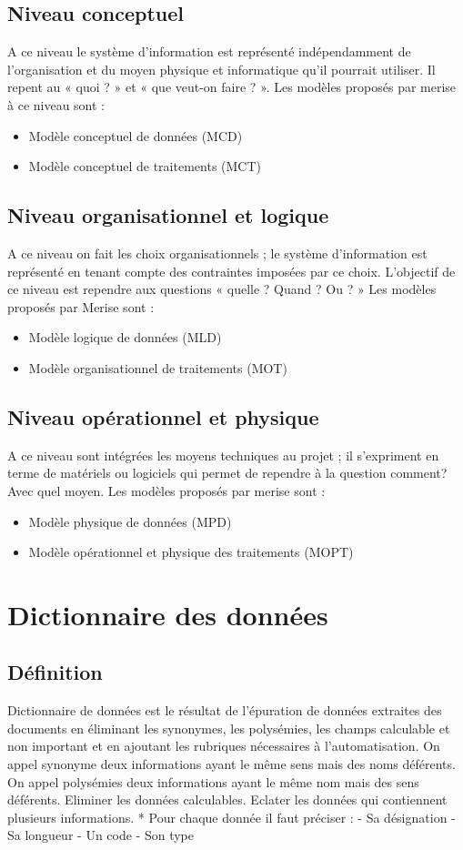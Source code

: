 \subsection{Niveau conceptuel}
A ce niveau le système d'information est représenté indépendamment de
l'organisation et du moyen physique et informatique qu'il pourrait utiliser. Il
repent au « quoi ? » et « que veut-on faire ? ».
Les modèles proposés par merise à ce niveau sont :
\begin{itemize}
    \item Modèle conceptuel de données (MCD)
    \item Modèle conceptuel de traitements (MCT)
\end{itemize}

\subsection{Niveau organisationnel et logique}
A ce niveau  on fait les choix organisationnels ; le système d'information est
représenté en tenant compte des contraintes imposées par ce choix. L'objectif
de ce niveau est rependre aux questions « quelle ? Quand ? Ou ? »
Les modèles proposés par Merise sont :
\begin{itemize}
    \item Modèle logique de données (MLD)
    \item Modèle organisationnel de traitements (MOT)
\end{itemize}

\subsection{Niveau opérationnel et physique}
A ce niveau sont intégrées les moyens techniques au projet ; il s’expriment en
terme de matériels ou logiciels  qui permet de rependre à la question
comment? Avec quel moyen.
Les modèles proposés par merise sont :
\begin{itemize}
    \item Modèle physique de données (MPD)
    \item Modèle opérationnel et physique des traitements (MOPT)
\end{itemize}

\section{Dictionnaire des données}
\subsection{Définition}
Dictionnaire de données est le résultat de l'épuration de données extraites
des documents en éliminant les synonymes, les polysémies, les champs
calculable et non important et en ajoutant les rubriques nécessaires à
l'automatisation.
 On appel synonyme deux informations ayant le même sens mais des
noms déférents.
 On appel polysémies deux informations ayant le même nom mais des
sens déférents.
 Eliminer les données calculables.
 Eclater les données qui contiennent plusieurs informations.
* Pour chaque donnée il faut préciser :
- Sa désignation
- Sa longueur
- Un code
- Son type
